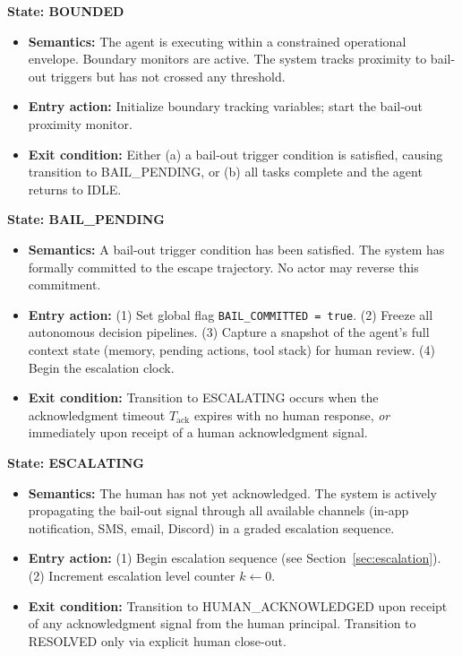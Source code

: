 \bigskip

\noindent\textbf{State: BOUNDED}

\begin{itemize}
  \item \textbf{Semantics:} The agent is executing within a constrained operational envelope. Boundary monitors are active. The system tracks proximity to bail-out triggers but has not crossed any threshold.
  \item \textbf{Entry action:} Initialize boundary tracking variables; start the bail-out proximity monitor.
  \item \textbf{Exit condition:} Either (a) a bail-out trigger condition is satisfied, causing transition to BAIL\_PENDING, or (b) all tasks complete and the agent returns to IDLE.
\end{itemize}

\bigskip

\noindent\textbf{State: BAIL\_PENDING}

\begin{itemize}
  \item \textbf{Semantics:} A bail-out trigger condition has been satisfied. The system has formally committed to the escape trajectory. No actor may reverse this commitment.
  \item \textbf{Entry action:} (1) Set global flag \texttt{BAIL\_COMMITTED = true}. (2) Freeze all autonomous decision pipelines. (3) Capture a snapshot of the agent's full context state (memory, pending actions, tool stack) for human review. (4) Begin the escalation clock.
  \item \textbf{Exit condition:} Transition to ESCALATING occurs when the acknowledgment timeout $T_{\text{ack}}$ expires with no human response, \emph{or} immediately upon receipt of a human acknowledgment signal.
\end{itemize}

\bigskip

\noindent\textbf{State: ESCALATING}

\begin{itemize}
  \item \textbf{Semantics:} The human has not yet acknowledged. The system is actively propagating the bail-out signal through all available channels (in-app notification, SMS, email, Discord) in a graded escalation sequence.
  \item \textbf{Entry action:} (1) Begin escalation sequence (see Section~\ref{sec:escalation}). (2) Increment escalation level counter $k \gets 0$.
  \item \textbf{Exit condition:} Transition to HUMAN\_ACKNOWLEDGED upon receipt of any acknowledgment signal from the human principal. Transition to RESOLVED only via explicit human close-out.
\end{itemize}

